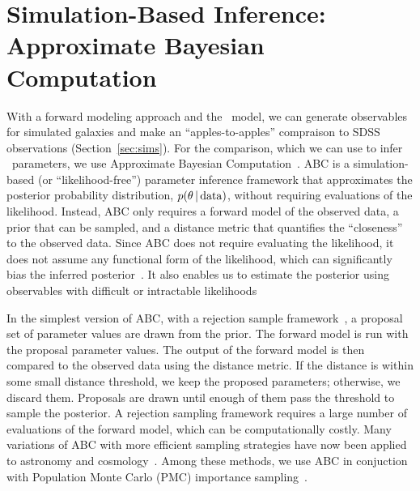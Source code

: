 \section{Simulation-Based Inference: Approximate Bayesian Computation} \label{sec:abc}
With a forward modeling approach and the \eda~model, we can generate
observables for simulated galaxies and make an ``apples-to-apples'' compraison
to SDSS observations (Section~\ref{sec:sims}). For the comparison, which we can
use to infer \eda~parameters, we use Approximate Bayesian
Computation~\citep[hereafter ABC;][]{diggle1984, tavare1997, pritchard1999,
beaumont2009, delmoral2012}.  ABC is a simulation-based (or
``likelihood-free'') parameter inference framework that approximates the
posterior probability distribution, $p(\theta\,|\,{\rm data})$, without
requiring evaluations of the likelihood.  Instead, ABC only requires a forward
model of the observed data, a prior that can be sampled, and a distance metric
that quantifies the ``closeness'' to the observed data. Since ABC does not
require evaluating the likelihood, it does not assume any functional form of
the likelihood, which can significantly bias the inferred
posterior~\citep[\eg][]{hahn2019}. It also enables us to estimate the posterior using
observables with difficult or intractable likelihoods~\citep{hahn2017a}

In the simplest version of ABC, with a rejection sample
framework~\citep{pritchard1999}, a proposal set of parameter values are drawn
from the prior. The forward model is run with the proposal parameter values.
The output of the forward model is then compared to the observed data
using the distance metric. If the distance is within some small distance
threshold, we keep the proposed parameters; otherwise, we discard them. 
Proposals are drawn until enough of them pass the threshold to sample the posterior. A rejection sampling
framework requires a large number of evaluations of the forward model, which
can be computationally costly. Many variations of ABC with more efficient
sampling strategies have now been applied to astronomy and
cosmology~\citep[\eg][]{cameron2012, weyant2013, ishida2015, lin2016, alsing2018}.
Among these methods, we use ABC in conjuction with Population Monte Carlo (PMC) 
importance sampling~\citep{hahn2017a, hahn2017b, hahn2019a}.

